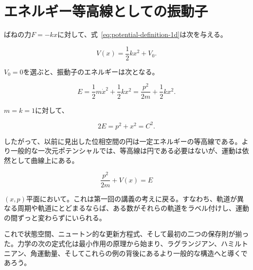 \section{エネルギー等高線としての振動子}
\enlargethispage{3\baselineskip}

ばねの力\(F=-kx\)に対して、式~\eqref{eq:potential-definition-1d}は次を与える。

\begin{equation}
  V(x)=\frac12kx^2+V_0.
  \label{eq:spring-potential}
\end{equation}

\(V_0=0\)を選ぶと、振動子のエネルギーは次となる。

\begin{equation}
  E=\frac12m\dot x^2+\frac12kx^2
   =\frac{p^2}{2m}+\frac12kx^2.
  \label{eq:oscillator-energy}
\end{equation}

\(m=k=1\)に対して、

\begin{equation}
  2E=p^2+x^2=C^2.
  \label{eq:oscillator-energy-circle}
\end{equation}

したがって、以前に見出した位相空間の円は一定エネルギーの等高線である。より一般的な一次元ポテンシャルでは、等高線は円である必要はないが、運動は依然として曲線上にある。

\begin{equation}
  \frac{p^2}{2m}+V(x)=E
  \label{eq:general-energy-contour}
\end{equation}

\((x,p)\)平面において。これは第一回の講義の考えに戻る。すなわち、軌道が異なる周期や軌道にとどまるならば、ある数がそれらの軌道をラベル付けし、運動の間ずっと変わらずにいられる。

これで状態空間、ニュートン的な更新方程式、そして最初の二つの保存則が揃った。力学の次の定式化は最小作用の原理から始まり、ラグランジアン、ハミルトニアン、角運動量、そしてこれらの例の背後にあるより一般的な構造へと導くであろう。

\begin{classroomqa}
\end{classroomqa}